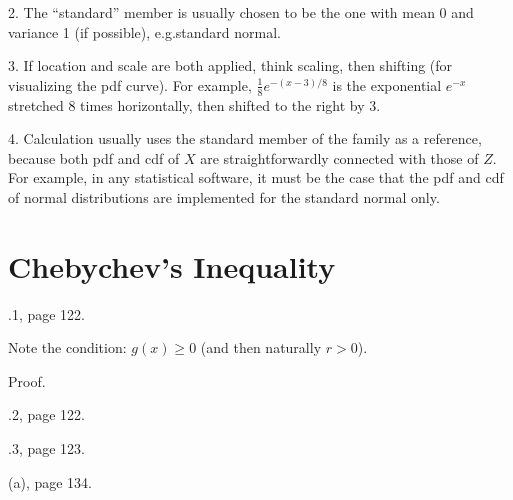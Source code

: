 \documentclass[12pt]{article}
\begin{document}
2. The ``standard'' member is usually chosen to be the one with mean 0
and variance 1 (if possible), e.g.\@ standard normal.

3. If location and scale are both applied, think scaling, then shifting
(for visualizing the pdf curve).
For example,
$\frac{1}{8} e^{-(x - 3)/8}$ is the exponential $e^{-x}$
stretched 8 times horizontally, then shifted to the right by 3.

4. Calculation usually uses the standard member of the family as a
reference, because both pdf and cdf of $X$ are straightforwardly
connected with those of $Z$.
For example, in any statistical software,
it must be the case that the pdf and cdf of normal distributions
are implemented for the standard normal only.


\section{Chebychev's Inequality}


.1, page 122.

Note the condition: $g(x) \ge 0$ (and then naturally $r > 0$).

Proof.

.2, page 122.

.3, page 123.

(a), page 134.
\end{document}
